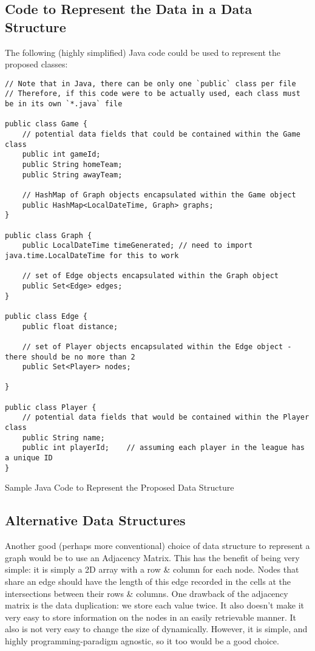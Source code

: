 \documentclass[a4paper,11pt]{article}
\newenvironment{code}{\captionsetup{type=listing}}{}
\begin{document}
\subsection{Code to Represent the Data in a Data Structure}\label{sec:data_structure_code}
The following (highly simplified) Java code could be used to represent the proposed classes:
\begin{code}
\begin{verbatim}
// Note that in Java, there can be only one `public` class per file
// Therefore, if this code were to be actually used, each class must be in its own `*.java` file

public class Game {
    // potential data fields that could be contained within the Game class
    public int gameId;
    public String homeTeam;
    public String awayTeam;

    // HashMap of Graph objects encapsulated within the Game object
    public HashMap<LocalDateTime, Graph> graphs;
}

public class Graph {
    public LocalDateTime timeGenerated; // need to import java.time.LocalDateTime for this to work 

    // set of Edge objects encapsulated within the Graph object
    public Set<Edge> edges;
}

public class Edge {
    public float distance;

    // set of Player objects encapsulated within the Edge object - there should be no more than 2
    public Set<Player> nodes;
    
}

public class Player {
    // potential data fields that would be contained within the Player class
    public String name;
    public int playerId;    // assuming each player in the league has a unique ID
}
\end{verbatim}
\caption{Sample Java Code to Represent the Proposed Data Structure}
\end{code}

\subsection{Alternative Data Structures}
Another good (perhaps more conventional) choice of data structure to represent a graph would be to use an Adjacency Matrix.
This has the benefit of being very simple: it is simply a 2D array with a row \& column for each node. 
Nodes that share an edge should have the length of this edge recorded in the cells at the intersections between their rows \& columns.
One drawback of the adjacency matrix is the data duplication: we store each value twice.
It also doesn't make it very easy to store information on the nodes in an easily retrievable manner. 
It also is not very easy to change the size of dynamically.
However, it is simple, and highly programming-paradigm agnostic, so it too would be a good choice.
\end{document}
